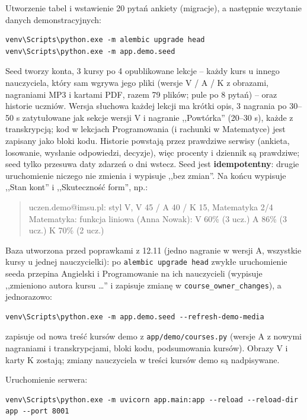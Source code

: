 Utworzenie tabel i wstawienie 20 pytań ankiety (migracje), a następnie wczytanie danych demonstracyjnych:

\begin{lstlisting}
venv\Scripts\python.exe -m alembic upgrade head
venv\Scripts\python.exe -m app.demo.seed
\end{lstlisting}

Seed tworzy konta, 3 kursy po 4 opublikowane lekcje -- każdy kurs u innego nauczyciela, który sam wgrywa jego pliki (wersje V / A / K z obrazami, nagraniami MP3 i kartami PDF, razem 79 plików; pule po 8 pytań) -- oraz historie uczniów. Wersja słuchowa każdej lekcji ma krótki opis, 3 nagrania po 30--50 s zatytułowane jak sekcje wersji V i nagranie ,,Powtórka'' (20--30 s), każde z transkrypcją; kod w lekcjach Programowania (i rachunki w Matematyce) jest zapisany jako bloki kodu. Historie powstają przez prawdziwe serwisy (ankieta, losowanie, wysłanie odpowiedzi, decyzje), więc procenty i dziennik są prawdziwe; seed tylko przesuwa daty zdarzeń o dni wstecz. Seed jest \textbf{idempotentny}: drugie uruchomienie niczego nie zmienia i wypisuje ,,bez zmian''. Na końcu wypisuje ,,Stan kont'' i ,,Skuteczność form'', np.:

\begin{quote}\ttfamily\small
uczen.demo@imsu.pl: styl V, V 45 / A 40 / K 15, Matematyka 2/4\\
Matematyka: funkcja liniowa (Anna Nowak): V 60\% (3 ucz.) \textperiodcentered{} A 86\% (3 ucz.) \textperiodcentered{} K 70\% (2 ucz.)
\end{quote}

Baza utworzona przed poprawkami z 12.11 (jedno nagranie w wersji A, wszystkie kursy u jednej nauczycielki): po \texttt{alembic upgrade head} zwykłe uruchomienie seeda przepina Angielski i Programowanie na ich nauczycieli (wypisuje ,,zmieniono autora kursu \ldots'' i zapisuje zmianę w \texttt{course\_owner\_changes}), a jednorazowo:

\begin{lstlisting}
venv\Scripts\python.exe -m app.demo.seed --refresh-demo-media
\end{lstlisting}

zapisuje od nowa treść kursów demo z \nolinkurl{app/demo/courses.py} (wersje A z nowymi nagraniami i transkrypcjami, bloki kodu, podsumowania kursów). Obrazy V i karty K zostają; zmiany nauczyciela w treści kursów demo są nadpisywane.

Uruchomienie serwera:

\begin{lstlisting}
venv\Scripts\python.exe -m uvicorn app.main:app --reload --reload-dir app --port 8001
\end{lstlisting}

